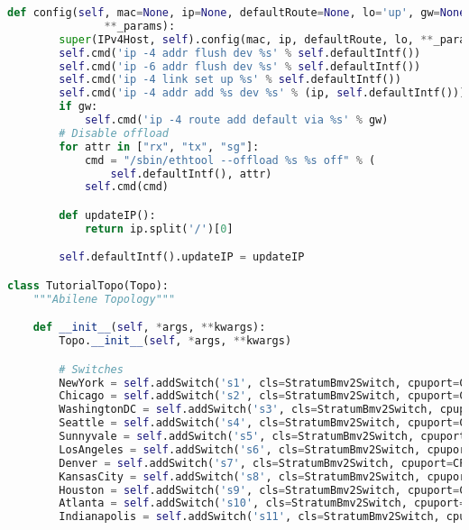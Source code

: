 \begin{lstlisting}[language=Python]
    def config(self, mac=None, ip=None, defaultRoute=None, lo='up', gw=None,
               **_params):
        super(IPv4Host, self).config(mac, ip, defaultRoute, lo, **_params)
        self.cmd('ip -4 addr flush dev %s' % self.defaultIntf())
        self.cmd('ip -6 addr flush dev %s' % self.defaultIntf())
        self.cmd('ip -4 link set up %s' % self.defaultIntf())
        self.cmd('ip -4 addr add %s dev %s' % (ip, self.defaultIntf()))
        if gw:
            self.cmd('ip -4 route add default via %s' % gw)
        # Disable offload
        for attr in ["rx", "tx", "sg"]:
            cmd = "/sbin/ethtool --offload %s %s off" % (
                self.defaultIntf(), attr)
            self.cmd(cmd)

        def updateIP():
            return ip.split('/')[0]

        self.defaultIntf().updateIP = updateIP

class TutorialTopo(Topo):
    """Abilene Topology"""

    def __init__(self, *args, **kwargs):
        Topo.__init__(self, *args, **kwargs)

        # Switches
        NewYork = self.addSwitch('s1', cls=StratumBmv2Switch, cpuport=CPU_PORT)
        Chicago = self.addSwitch('s2', cls=StratumBmv2Switch, cpuport=CPU_PORT)
        WashingtonDC = self.addSwitch('s3', cls=StratumBmv2Switch, cpuport=CPU_PORT)
        Seattle = self.addSwitch('s4', cls=StratumBmv2Switch, cpuport=CPU_PORT)
        Sunnyvale = self.addSwitch('s5', cls=StratumBmv2Switch, cpuport=CPU_PORT)
        LosAngeles = self.addSwitch('s6', cls=StratumBmv2Switch, cpuport=CPU_PORT)
        Denver = self.addSwitch('s7', cls=StratumBmv2Switch, cpuport=CPU_PORT)
        KansasCity = self.addSwitch('s8', cls=StratumBmv2Switch, cpuport=CPU_PORT)
        Houston = self.addSwitch('s9', cls=StratumBmv2Switch, cpuport=CPU_PORT)
        Atlanta = self.addSwitch('s10', cls=StratumBmv2Switch, cpuport=CPU_PORT)
        Indianapolis = self.addSwitch('s11', cls=StratumBmv2Switch, cpuport=CPU_PORT)



\end{lstlisting}

